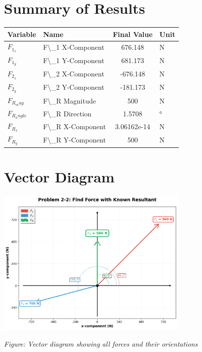 \documentclass[11pt,a4paper]{article}
\begin{document}
\section{Summary of Results}

\begin{longtable}{llSl}
\toprule
Variable & Name & {Final Value} & Unit \\
\midrule
\endhead
$F_{1_x}$ & F\textbackslash{}_1 X-Component & 676.148 & N \\
$F_{1_y}$ & F\textbackslash{}_1 Y-Component & 681.173 & N \\
$F_{2_x}$ & F\textbackslash{}_2 X-Component & -676.148 & N \\
$F_{2_y}$ & F\textbackslash{}_2 Y-Component & -181.173 & N \\
$F_{R_mag}$ & F\textbackslash{}_R Magnitude & 500 & N \\
$F_{R_angle}$ & F\textbackslash{}_R Direction & 1.5708 & ° \\
$F_{R_x}$ & F\textbackslash{}_R X-Component & 3.06162e-14 & N \\
$F_{R_y}$ & F\textbackslash{}_R Y-Component & 500 & N \\
\bottomrule
\end{longtable}

\section{Vector Diagram}

\begin{center}
\includegraphics[width=0.7\textwidth]{Problem_2-2_Find_Force_with_Known_Resultant_diagram.png}
\end{center}

\begin{center}
\textit{Figure: Vector diagram showing all forces and their orientations}
\end{center}
\end{document}
